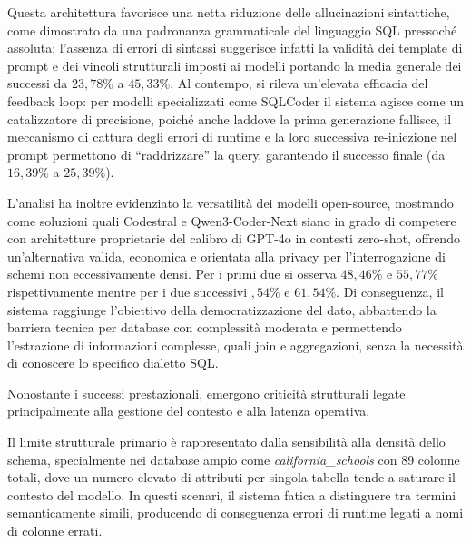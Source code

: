 Questa architettura favorisce una netta riduzione delle allucinazioni
sintattiche, come dimostrato da una padronanza grammaticale del
linguaggio SQL pressoché assoluta; l'assenza di errori di sintassi
suggerisce infatti la validità dei template di prompt e dei vincoli
strutturali imposti ai modelli portando la media generale dei successi da \(23,78\%\) a \(45,33\%\). Al contempo, si rileva un'elevata
efficacia del feedback loop: per modelli specializzati come
SQLCoder il sistema agisce come un catalizzatore di precisione, poiché
anche laddove la prima generazione fallisce, il meccanismo di cattura
degli errori di runtime e la loro successiva re-iniezione nel prompt
permettono di ``raddrizzare'' la query, garantendo il successo finale (da \(16,39\%\) a \(25,39\%\)).

L'analisi ha inoltre evidenziato la versatilità dei modelli open-source,
mostrando come soluzioni quali Codestral e Qwen3-Coder-Next siano in grado
di competere con architetture proprietarie del calibro di GPT-4o in
contesti zero-shot, offrendo un'alternativa valida, economica e
orientata alla privacy per l'interrogazione di schemi non eccessivamente
densi. Per i primi due si osserva \(48,46\%\) e \(55,77\%\) rispettivamente 
mentre per i due successivi \(,54\%\) e \(61,54\%\). Di conseguenza, il 
sistema raggiunge l'obiettivo della democratizzazione del dato, abbattendo la barriera tecnica per
database con complessità moderata e permettendo l'estrazione di
informazioni complesse, quali join e aggregazioni, senza la necessità di
conoscere lo specifico dialetto SQL.

Nonostante i successi prestazionali, emergono criticità strutturali
legate principalmente alla gestione del contesto e alla latenza
operativa.

Il limite strutturale primario è rappresentato dalla sensibilità alla
densità dello schema, specialmente nei database ampio come
\emph{california\_schools} con 89 colonne totali, dove un numero elevato di attributi per
singola tabella tende a saturare il contesto del modello. In questi
scenari, il sistema fatica a distinguere tra termini semanticamente
simili, producendo di conseguenza errori di runtime legati a nomi di
colonne errati.

